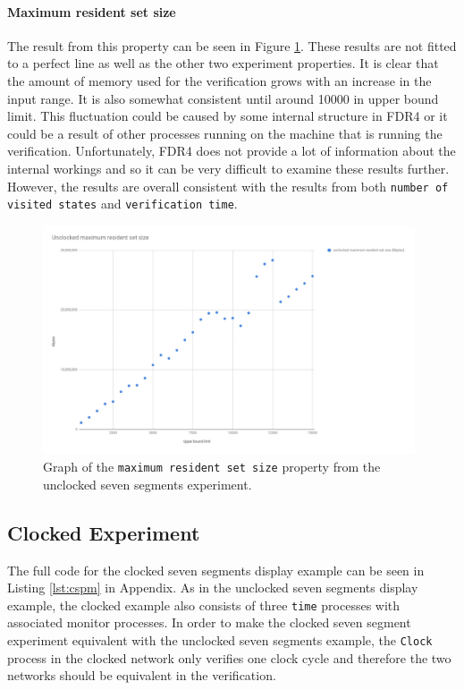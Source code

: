 \paragraph{Maximum resident set size}
The result from this property can be seen in Figure \ref{fig:unclocked_resident_size}. These results are not fitted to a perfect line as well as the other two experiment properties. It is clear that the amount of memory used for the verification grows with an increase in the input range. It is also somewhat consistent until around 10000 in upper bound limit. This fluctuation could be caused by some internal structure in FDR4 or it could be a result of other processes running on the machine that is running the verification. Unfortunately, FDR4 does not provide a lot of information about the internal workings and so it can be very difficult to examine these results further. However, the results are overall consistent with the results from both \texttt{number of visited states} and \texttt{verification time}.
\begin{figure}
    \includegraphics[width=0.98\textwidth]{./figures/temporary_graphs/unclocked_maximum_resident_set_size.jpg}
\caption{Graph of the \texttt{maximum resident set size} property from the unclocked seven segments experiment.}
\label{fig:unclocked_resident_size}
\end{figure}

\subsection{Clocked Experiment}
The full code for the clocked seven segments display example can be seen in Listing \ref{lst:cspm} in Appendix. %
As in the unclocked seven segments display example, the clocked example also consists of three \texttt{time} processes with associated monitor processes.
In order to make the clocked seven segment experiment equivalent with the unclocked seven segments example, the \texttt{Clock} process in the clocked network only verifies one clock cycle and therefore the two networks should be equivalent in the verification.
